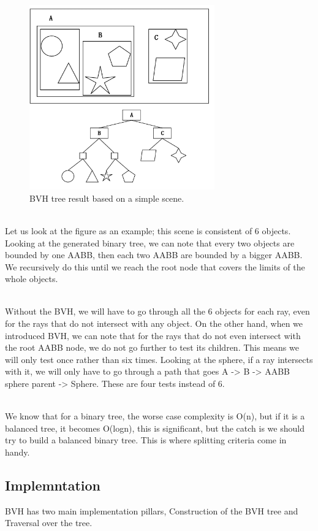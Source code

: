 \documentclass[11pt,a4paper]{article}
\begin{document}
\begin{figure}[h]	
     \centering
     \captionsetup{justification=centering,margin=2cm}
     \includegraphics[width=8cm]{images/bvh_tree.png}
     \caption{BVH tree result based on a simple scene. \protect\cite{Ericson2004} }
        \label{fig:dice}
\end{figure}

\noindent
\\
Let us look at the figure as an example; this scene is consistent of 6 objects. Looking at the generated binary tree, we can note that every two objects are bounded by one AABB, then each two AABB are bounded by a bigger AABB. We recursively do this until we reach the root node that covers the limits of the whole objects. 

\noindent
\\
Without the BVH, we will have to go through all the 6 objects for each ray, even for the rays that do not intersect with any object. On the other hand, when we introduced BVH, we can note that for the rays that do not even intersect with the root AABB node, we do not go further to test its children. This means we will only test once rather than six times. Looking at the sphere, if a ray intersects with it, we will only have to go through a path that goes A -> B -> AABB sphere parent -> Sphere. These are four tests instead of 6. 

\noindent
\\
We know that for a binary tree, the worse case complexity is O(n), but if it is a balanced tree, it becomes O(logn), this is significant, but the catch is we should try to build a balanced binary tree. This is where splitting criteria come in handy. 


\subsection{Implemntation}
BVH has two main implementation pillars, Construction of the BVH tree and Traversal over the tree.  
\end{document}
